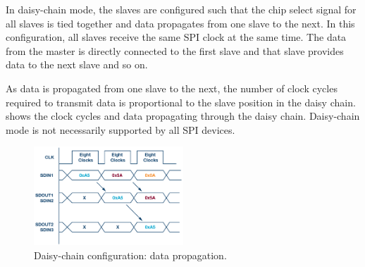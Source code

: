 In daisy-chain mode, the slaves are configured such that the chip select signal for all slaves is tied together and data propagates from one slave to the next. In this configuration, all slaves receive the same SPI clock at the same time. The data from the master is directly connected to the first slave and that slave provides data to the next slave and so on.

As data is propagated from one slave to the next, the number of clock cycles required to transmit data is proportional to the slave position in the daisy chain.  shows the clock cycles and data propagating through the daisy chain. Daisy-chain mode is not necessarily supported by all SPI devices. 

\begin{figure}[H]
\begin{center}
\includegraphics[width=0.5\textwidth]{images/SPIDaisyTiming.png}
\caption{Daisy-chain configuration: data propagation.}
\label{SPIDaisyTiming}
\end{center}
\end{figure} 

\clearpage